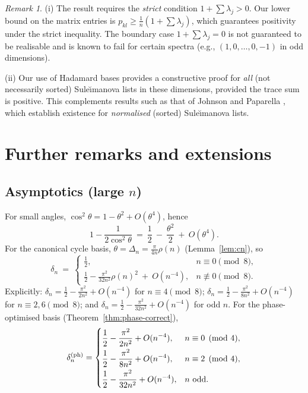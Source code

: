 \documentclass[12pt,fleqn]{amsart}
\renewcommand{\ge}{\geqslant}
\theoremstyle{definition}
\theoremstyle{remark}
\newtheorem{rem}[thm]{Remark}
\newcommand{\1}{\mathbf{1}}
\begin{document}
\begin{rem}
(i) The result requires the \emph{strict} condition $1+\sum\lambda_j>0$. Our lower bound on the matrix entries is $p_{kl}\ge \tfrac{1}{n}(1+\sum\lambda_j)$, which guarantees positivity under the strict inequality. The boundary case $1+\sum\lambda_j=0$ is not guaranteed to be realisable and is known to fail for certain spectra (e.g., $(1,0,\dots,0,-1)$ in odd dimensions).

(ii) Our use of Hadamard bases provides a constructive proof for \emph{all} (not necessarily sorted) Sule\u{\i}manova lists in these dimensions, provided the trace sum is positive. This complements results such as that of Johnson and Paparella \cite{JP16}, which establish existence for \emph{normalised} (sorted) Sule\u{\i}manova lists.
\end{rem}

\section{Further remarks and extensions}

\subsection*{Asymptotics (large \texorpdfstring{$n$}{n})}
For small angles, $\cos^2\theta=1-\theta^2+O(\theta^4)$, hence
\[
1-\frac{1}{2\cos^2\theta}\ =\ \frac12\ -\ \frac{\theta^2}{2}\ +\ O(\theta^4).
\]
For the canonical cycle basis, $\theta=\Delta_n=\frac{\pi}{4n}\rho(n)$ (Lemma~\ref{lem:cn}), so
\[
\delta_n\ =\
\begin{cases}
\displaystyle \frac12, & n\equiv 0\pmod{8},\\[1mm]
\displaystyle \frac12 - \frac{\pi^2}{32n^2}\rho(n)^2\ +\ O(n^{-4}), & n\not\equiv 0\pmod{8}.
\end{cases}
\]
Explicitly: $\delta_n=\frac12-\frac{\pi^2}{2n^2}+O(n^{-4})$ for $n\equiv 4\pmod{8}$; $\delta_n=\frac12-\frac{\pi^2}{8n^2}+O(n^{-4})$ for $n\equiv 2,6\pmod{8}$; and $\delta_n=\frac12-\frac{\pi^2}{32n^2}+O(n^{-4})$ for odd $n$. For the phase-optimised basis (Theorem~\ref{thm:phase-correct}),
\[
\delta_n^{\rm (ph)}=
\begin{cases}
\displaystyle \frac12-\frac{\pi^2}{2n^2}+O(n^{-4}),   & n\equiv 0\pmod{4},\\[2mm]
\displaystyle \frac12-\frac{\pi^2}{8n^2}+O(n^{-4}),  & n\equiv 2\pmod{4},\\[2mm]
\displaystyle \frac12-\frac{\pi^2}{32n^2}+O(n^{-4}), & n\ \text{odd}.
\end{cases}
\]
\end{document}

